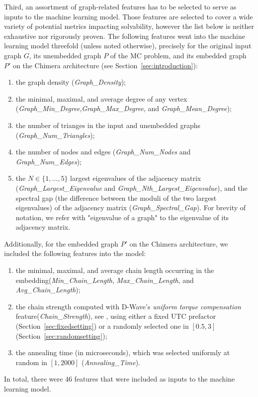 \documentclass[a4paper,11pt]{article}
\begin{document}
Third, an assortment of graph-related features has to be selected to serve as inputs to the machine learning model. Those features are selected to cover a wide variety of potential metrics impacting solvability, however the list below is neither exhaustive nor rigorously proven. The following features went into the machine learning model threefold (unless noted otherwise), precisely for the original input graph $G$, its unembedded graph $P$ of the MC problem, and its embedded graph $P'$ on the Chimera architecture (see Section~\ref{sec:introduction}):
\begin{enumerate}
    \item the graph density (\textit{Graph\_Density});
    \item the minimal, maximal, and average degree of any vertex (\textit{Graph\_Min\_Degree},\linebreak \textit{Graph\_Max\_Degree}, and \textit{Graph\_Mean\_Degree});
    \item the number of trianges in the input and unembedded graphs (\textit{Graph\_Num\_Triangles});
    \item the number of nodes and edges (\textit{Graph\_Num\_Nodes} and \textit{Graph\_Num\_Edges});
    \item the $N \in \{1,\ldots,5\}$ largest eigenvalues of the adjacency matrix (\textit{Graph\_Largest\_Eigenvalue} and \textit{Graph\_Nth\_Largest\_Eigenvalue}), and the spectral gap (the difference between the moduli of the two largest eigenvalues) of the adjacency matrix (\textit{Graph\_Spectral\_Gap}). For brevity of notation, we refer with "eigenvalue of a graph" to the eigenvalue of its adjacency matrix.
\end{enumerate}

Additionally, for the embedded graph $P'$ on the Chimera architecture, we included the following features into the model:
\begin{enumerate}
    \item the minimal, maximal, and average chain length occurring in the embedding\linebreak (\textit{Min\_Chain\_Length}, \textit{Max\_Chain\_Length}, and \textit{Avg\_Chain\_Length});
    \item the chain strength computed with D-Wave's \textit{uniform torque compensation} feature\linebreak (\textit{Chain\_Strength}), see \cite{dwave_torque}, using either a fixed UTC prefactor (Section~\ref{sec:fixedsetting}) or a randomly selected one in $[0.5,3]$ (Section~\ref{sec:randomsetting});
    \item the annealing time (in microseconds), which was selected uniformly at random in $[1,2000]$ (\textit{Annealing\_Time}).
\end{enumerate}
In total, there were $46$ features that were included as inputs to the machine learning model.
\end{document}
